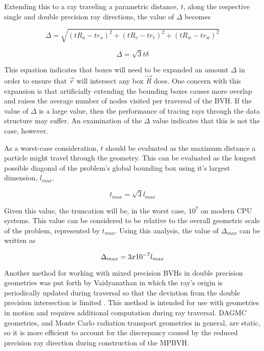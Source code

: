 Extending this to a ray traveling a parametric distance, $t$, along the
respective single and double precision ray directions, the value of $\Delta$
becomes

$$ \Delta = \sqrt{ (tR_{u} - tr_{u})^{2} + (tR_{v} - tr_{v})^{2} + (tR_{w} -
  tr_{w})^{2} } $$

$$ \Delta = \sqrt{3} t \delta $$

This equation indicates that boxes will need to be expanded an amount $\Delta$
in order to ensure that $\vec{r}$ will intersect any box $\vec{R}$ does. One
concern with this expansion is that artificially extending the bounding boxes
causes more overlap and raises the average number of nodes visited per traversal
of the BVH. If the value of $\Delta$ is a large value, then the performance of
tracing rays through the data structure may suffer. An examination of the
$\Delta$ value indicates that this is not the case, however.

As a worst-case consideration, $t$ should be evaluated as the maximum distance a
particle might travel through the geometry. This can be evaluated as the longest
possible diagonal of the problem's global bounding box using it's largest
dimension, $l_{max}$.

$$ t_{max} = \sqrt{3} l_{max} $$

Given this value, the truncation will be, in the worst case, $10^{7}$ on modern
CPU systems. This value can be considered to be relative to the overall
geometric scale of the problem, represented by $t_{max}$. Using this analysis,
the value of $\Delta_{max}$ can be written as 

\begin{equation}
  \centering
  \Delta_{max} = 3 x 10^{-7} l_{max}
  \label{eq:box_extension_limit}
\end{equation}

Another method for working with mixed precision BVHs in double precision
geometries was put forth by Vaidyanathan in which the ray's origin is
periodically updated during traversal so that the deviation from the double
precision intersection is limited \cite{Vaidyanathan_2016}. This method is
intended for use with geometries in motion and requires additional computation
during ray traversal. DAGMC geometries, and Monte Carlo radiation transport
geometries in general, are static, so it is more efficient to account for the
discrepancy caused by the reduced precision ray direction during construction of
the MPBVH.

